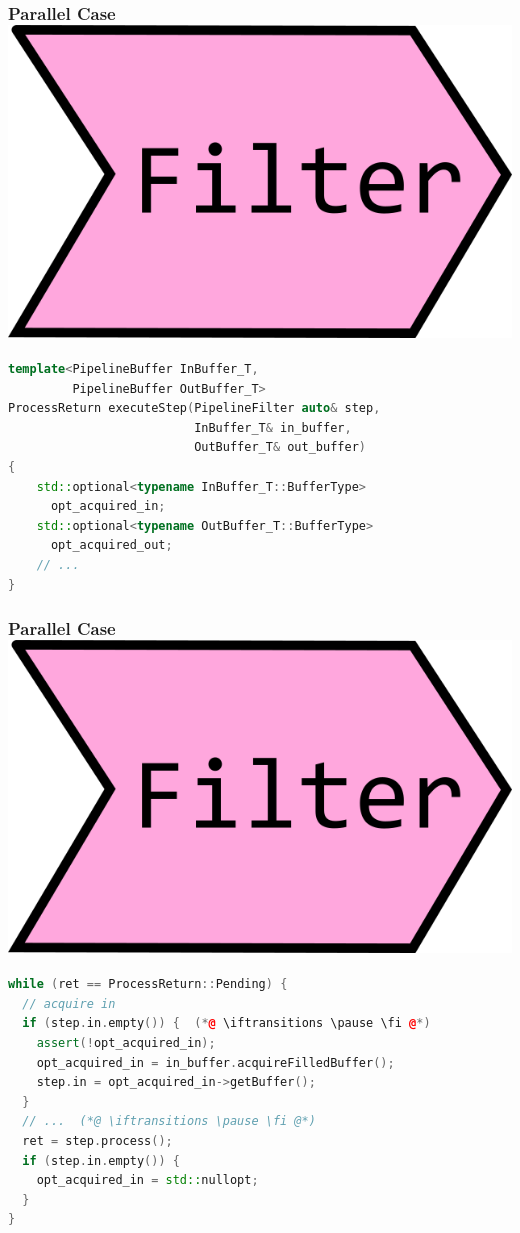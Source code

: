\documentclass[aspectratio=169]{beamer}
\newif\iftransitions
\begin{document}
\begin{frame}[fragile]
  \frametitle{Parallel Case \hspace{310pt} \includegraphics[height=.1\textheight]{pipelinesgfx/filter.png}}

  \begin{lstlisting}[language={C++}]
template<PipelineBuffer InBuffer_T,
         PipelineBuffer OutBuffer_T>
ProcessReturn executeStep(PipelineFilter auto& step,
                          InBuffer_T& in_buffer,
                          OutBuffer_T& out_buffer)
{
    std::optional<typename InBuffer_T::BufferType>
      opt_acquired_in;
    std::optional<typename OutBuffer_T::BufferType>
      opt_acquired_out;
    // ...
}
  \end{lstlisting}
\end{frame}

\begin{frame}[fragile]
  \frametitle{Parallel Case \hspace{310pt} \includegraphics[height=.1\textheight]{pipelinesgfx/filter.png}}

  \begin{lstlisting}[language={C++}]
while (ret == ProcessReturn::Pending) {
  // acquire in
  if (step.in.empty()) {  (*@ \iftransitions \pause \fi @*)
    assert(!opt_acquired_in);
    opt_acquired_in = in_buffer.acquireFilledBuffer();
    step.in = opt_acquired_in->getBuffer();
  }
  // ...  (*@ \iftransitions \pause \fi @*)
  ret = step.process();
  if (step.in.empty()) {
    opt_acquired_in = std::nullopt;
  }
}
  \end{lstlisting}
\end{frame}
\end{document}
